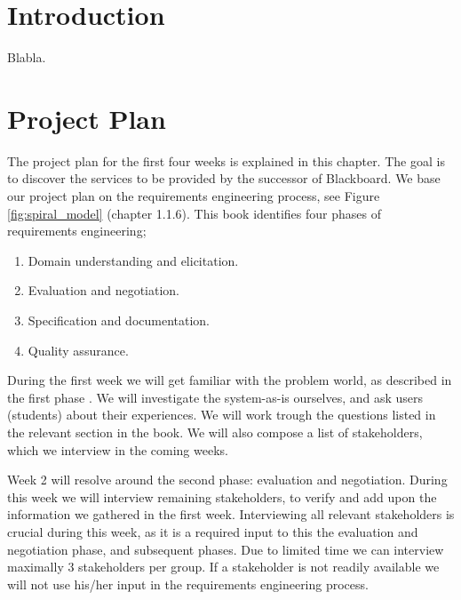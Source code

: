 
\chapter{Introduction}
Blabla.

\chapter{Project Plan}
The project plan for the first four weeks is explained in this chapter. The goal is to discover the services to be provided by the successor of Blackboard. We base our project plan on the requirements engineering process, see Figure \ref{fig:spiral_model} \cite{RE_book} (chapter 1.1.6). This book identifies four phases of requirements engineering; 

\begin{enumerate}
	\item Domain understanding and elicitation.
	\item Evaluation and negotiation.
	\item Specification and documentation.
	\item Quality assurance.
\end{enumerate}

During the first week we will get familiar with the problem world, as described in the first phase \cite{RE_book}. We will investigate the system-as-is ourselves, and ask users (students) about their experiences. We will work trough the questions listed in the relevant section in the book. We will also compose a list of stakeholders, which we interview in the coming weeks.

Week 2 will resolve around the second phase: evaluation and negotiation. During this week we will interview remaining stakeholders, to verify and add upon the information we gathered in the first week. Interviewing all relevant stakeholders is crucial during this week, as it is a required input to this the evaluation and negotiation phase, and subsequent phases. Due to limited time we can interview maximally 3 stakeholders per group. If a stakeholder is not readily available we will not use his/her input in the requirements engineering process. 

